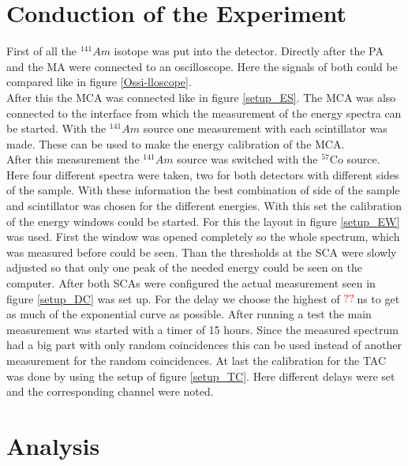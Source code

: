 \documentclass[30pt,a4paper]{article}
\begin{document}
 	\section{Conduction of the Experiment}
 	First of all the $^{141}Am$ isotope was put into the detector. Directly after the PA and the MA were connected to an oscilloscope. Here the signals of both could be compared like in figure \ref{Ossi-lloscope}.\\
 	After this the MCA was connected like in figure \ref{setup_ES}. The MCA was also connected to the interface from which the measurement of the energy spectra can be started. With the $^{141}Am$ source one measurement with each scintillator was made. These can be used to make the energy calibration of the MCA.\\
 	After this measurement the  $^{141}Am$ source was switched with the $^{57}$Co source. Here four different spectra were taken, two for both detectors with different sides of the sample. With these information the best combination of side of the sample and scintillator was chosen for the different energies. With this set the calibration of the energy windows could be started. For this the layout in figure \ref{setup_EW} was used. First the window was opened completely so the whole spectrum, which was measured before could be seen. Than the thresholds at the SCA were slowly adjusted so that only one peak of the needed energy could be seen on the computer. After both SCAs were configured the actual measurement seen in figure \ref{setup_DC} was set up. For the delay we choose the highest of $\color{red} ??$\,ns to get as much of the exponential curve as possible. After running a test the main measurement was started with a timer of 15 hours. Since the measured spectrum had a big part with only random coincidences this can be used instead of another measurement for the random coincidences. At last the calibration for the TAC was done by using the setup of figure \ref{setup_TC}. Here different delays were set and the corresponding channel were noted.
 	\section{Analysis}
\end{document}
